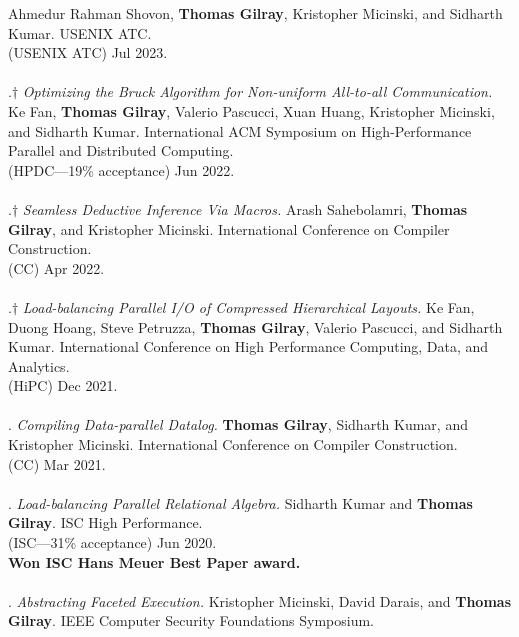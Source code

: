 Ahmedur Rahman Shovon, \textbf{Thomas Gilray}, Kristopher Micinski, and Sidharth Kumar.
USENIX ATC.
\\(USENIX ATC) Jul 2023. 
\\ \vspace{-0.1cm}\\
\paper.$\dagger$ \textit{Optimizing the Bruck Algorithm for Non-uniform All-to-all Communication.}
Ke Fan, \textbf{Thomas Gilray}, Valerio Pascucci, Xuan Huang, Kristopher Micinski, and Sidharth Kumar.
International ACM Symposium on High-Performance Parallel and Distributed Computing.
\\(HPDC---19\% acceptance) Jun 2022. 
\\ \vspace{-0.1cm}\\
\paper.$\dagger$ \textit{Seamless Deductive Inference Via Macros.}
Arash Sahebolamri, \textbf{Thomas Gilray}, and Kristopher Micinski.
International Conference on Compiler Construction.
\\(CC) Apr 2022. 
\\ \vspace{-0.1cm}\\
\paper.$\dagger$ \textit{Load-balancing Parallel I/O of Compressed Hierarchical Layouts.}
Ke Fan, Duong Hoang, Steve Petruzza, \textbf{Thomas Gilray}, Valerio Pascucci, and Sidharth Kumar.
International Conference on High Performance Computing, Data, and Analytics.
\\(HiPC) Dec 2021. 
\\ \vspace{-0.1cm}\\
\paper. \textit{Compiling Data-parallel Datalog.}
\textbf{Thomas Gilray}, Sidharth Kumar, and Kristopher Micinski.
International Conference on Compiler Construction.
\\(CC) Mar 2021. 
\\ \vspace{-0.1cm}\\
\paper. \textit{Load-balancing Parallel Relational Algebra.}
Sidharth Kumar and \textbf{Thomas Gilray}.
ISC High Performance.
\\(ISC---31\% acceptance) Jun 2020. 
\\\textbf{Won ISC Hans Meuer Best Paper award.} \\ \vspace{-0.1cm}\\
\paper. \textit{Abstracting Faceted Execution.}
Kristopher Micinski, David Darais, and \textbf{Thomas Gilray}.
IEEE Computer Security Foundations Symposium.
